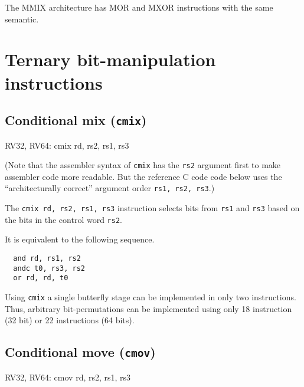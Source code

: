 The MMIX architecture has MOR and MXOR instructions with the same semantic.~\cite[p.~182f]{Knuth4A}




\section{Ternary bit-manipulation instructions}


\subsection{Conditional mix ({\tt cmix})}

\begin{rvb}
  RV32, RV64:
    cmix rd, rs2, rs1, rs3
\end{rvb}

(Note that the assembler syntax of {\tt cmix} has the {\tt rs2} argument first
to make assembler code more readable. But the reference C code code below uses
the ``architecturally correct'' argument order {\tt rs1, rs2, rs3}.)

The {\tt cmix rd, rs2, rs1, rs3} instruction selects bits from {\tt rs1} and {\tt rs3} based
on the bits in the control word {\tt rs2}.



It is equivalent to the following sequence.

\begin{minipage}{\linewidth}
\begin{verbatim}
  and rd, rs1, rs2
  andc t0, rs3, rs2
  or rd, rd, t0
\end{verbatim}
\end{minipage}

Using {\tt cmix} a single butterfly stage can be implemented in only two
instructions. Thus, arbitrary bit-permutations can be implemented using only
18 instruction (32 bit) or 22 instructions (64 bits).

\subsection{Conditional move ({\tt cmov})}

\begin{rvb}
  RV32, RV64:
    cmov rd, rs2, rs1, rs3
\end{rvb}

